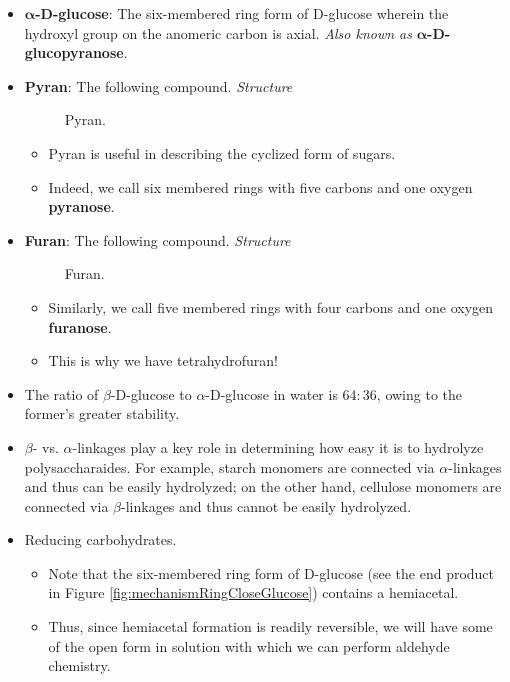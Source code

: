 \documentclass[../notes.tex]{subfiles}
\begin{document}
\begin{itemize}
    \item \textbf{$\bm{\alpha}$-D-glucose}: The six-membered ring form of D-glucose wherein the hydroxyl group on the anomeric carbon is axial. \emph{Also known as} \textbf{$\bm{\alpha}$-D-glucopyranose}.
    \item \textbf{Pyran}: The following compound. \emph{Structure}
    \begin{figure}[h!]
        \centering
        \footnotesize
        \caption{Pyran.}
        \label{fig:pyran}
    \end{figure}
    \begin{itemize}
        \item Pyran is useful in describing the cyclized form of sugars.
        \item Indeed, we call six membered rings with five carbons and one oxygen \textbf{pyranose}.
    \end{itemize}
    \item \textbf{Furan}: The following compound. \emph{Structure}
    \begin{figure}[h!]
        \centering
        \footnotesize
        \caption{Furan.}
        \label{fig:furan}
    \end{figure}
    \begin{itemize}
        \item Similarly, we call five membered rings with four carbons and one oxygen \textbf{furanose}.
        \item This is why we have tetrahydrofuran!
    \end{itemize}
    \item The ratio of $\beta$-D-glucose to $\alpha$-D-glucose in water is $64:36$, owing to the former's greater stability.
    \item $\beta$- vs. $\alpha$-linkages play a key role in determining how easy it is to hydrolyze polysaccharaides. For example, starch monomers are connected via $\alpha$-linkages and thus can be easily hydrolyzed; on the other hand, cellulose monomers are connected via $\beta$-linkages and thus cannot be easily hydrolyzed.
    \item Reducing carbohydrates.
    \begin{itemize}
        \item Note that the six-membered ring form of D-glucose (see the end product in Figure \ref{fig:mechanismRingCloseGlucose}) contains a hemiacetal.
        \item Thus, since hemiacetal formation is readily reversible, we will have some of the open form in solution with which we can perform aldehyde chemistry.

\end{itemize}
\end{itemize}
\end{document}
